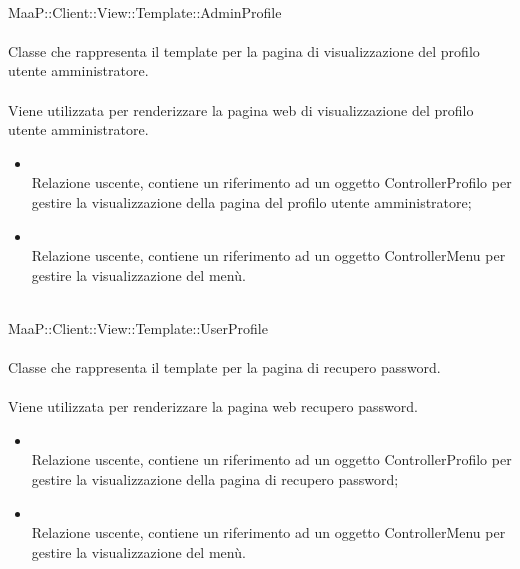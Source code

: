 	\\
	MaaP::Client::View::Template::AdminProfile\\
	\\
	Classe che rappresenta il template per la pagina di visualizzazione del profilo utente amministratore.\\
	\\
	Viene utilizzata per renderizzare la pagina web di visualizzazione del profilo utente amministratore.\\
	\begin{itemize}
	\item{}\\
	Relazione uscente, contiene un riferimento ad un oggetto ControllerProfilo per gestire la visualizzazione della pagina del profilo utente amministratore;
	\item{}\\
	Relazione uscente, contiene un riferimento ad un oggetto ControllerMenu per gestire la visualizzazione del menù.
	\end{itemize}
	
	\\
	MaaP::Client::View::Template::UserProfile\\
	\\
	Classe che rappresenta il template per la pagina di recupero password.\\
	\\
	Viene utilizzata per renderizzare la pagina web recupero password.
	\begin{itemize}
	\item{}\\
	Relazione uscente, contiene un riferimento ad un oggetto ControllerProfilo per gestire la visualizzazione della pagina di recupero password;
	\item{}\\
	Relazione uscente, contiene un riferimento ad un oggetto ControllerMenu per gestire la visualizzazione del menù.
	\end{itemize}
		
